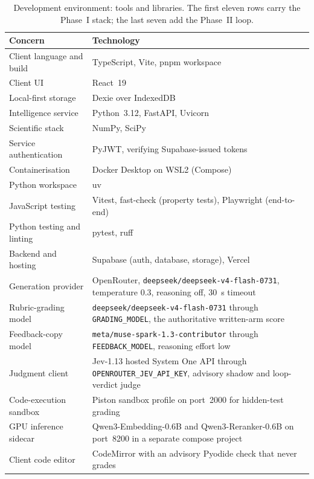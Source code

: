 \begin{table}[htbp]
\centering
\footnotesize
\caption{Development environment: tools and libraries. The first eleven rows carry the Phase~I stack; the last seven add the Phase~II loop.}
\label{tab:tools}
\begin{tabular}{p{4.0cm} p{8.4cm}}
\toprule
\textbf{Concern} & \textbf{Technology} \\
\midrule
Client language and build & TypeScript, Vite, pnpm workspace \\
Client UI & React~19 \\
Local-first storage & Dexie over IndexedDB \\
Intelligence service & Python~3.12, FastAPI, Uvicorn \\
Scientific stack & NumPy, SciPy \\
Service authentication & PyJWT, verifying Supabase-issued tokens \\
Containerisation & Docker Desktop on WSL2 (Compose) \\
Python workspace & uv \\
JavaScript testing & Vitest, fast-check (property tests), Playwright (end-to-end) \\
Python testing and linting & pytest, ruff \\
Backend and hosting & Supabase (auth, database, storage), Vercel \\
Generation provider & OpenRouter, \texttt{deepseek/deepseek-v4-flash-0731}, temperature 0.3, reasoning off, 30~s timeout \\
Rubric-grading model & \texttt{deepseek/deepseek-v4-flash-0731} through \texttt{GRADING\_MODEL}, the authoritative written-arm score \\
Feedback-copy model & \texttt{meta/muse-spark-1.3-contributor} through \texttt{FEEDBACK\_MODEL}, reasoning effort low \\
Judgment client & Jev-1.13 hosted System One API through \texttt{OPENROUTER\_JEV\_API\_KEY}, advisory shadow and loop-verdict judge \\
Code-execution sandbox & Piston sandbox profile on port~2000 for hidden-test grading \\
 GPU inference sidecar & Qwen3-Embedding-0.6B and Qwen3-Reranker-0.6B on port~8200 in a separate compose project \\
Client code editor & CodeMirror with an advisory Pyodide check that never grades \\
\bottomrule
\end{tabular}
\end{table}

